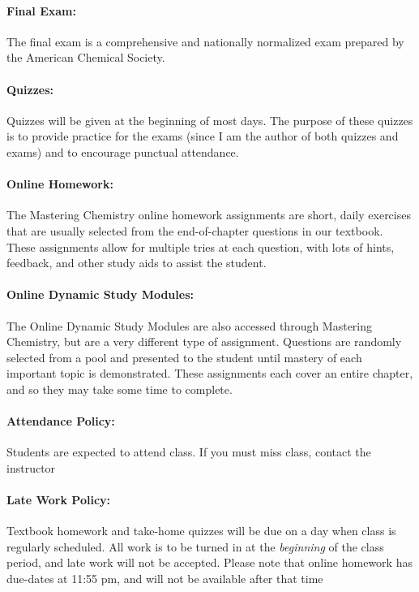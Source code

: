 \documentclass[12pt, letterpaper]{article}
\begin{document}
\paragraph{Final Exam:}
The final exam is a comprehensive and nationally normalized exam prepared by the American Chemical Society.

\paragraph{Quizzes:}
Quizzes will be given at the beginning of most days. The purpose of these quizzes is to provide practice for the exams (since I am the author of both quizzes and exams) and to encourage punctual attendance.

\paragraph{Online Homework:}
The Mastering Chemistry online homework assignments are short, daily exercises that are usually selected from the end-of-chapter questions in our textbook. These assignments allow for multiple tries at each question, with lots of hints, feedback, and other study aids to assist the student.

\paragraph{Online Dynamic Study Modules:}
The Online Dynamic Study Modules are also accessed through Mastering Chemistry, but are a very different type of assignment. Questions are randomly selected from a pool and presented to the student until mastery of each important topic is demonstrated. These assignments each cover an entire chapter, and so they may take some time to complete.

\paragraph{Attendance Policy:}
Students are expected to attend class. If you must miss class, contact the instructor

\paragraph{Late Work Policy:}
Textbook homework and take-home quizzes will be due on a day when class is regularly scheduled. All work is to be turned in at the \emph{beginning} of the class period, and late work will not be accepted. Please note that online homework has due-dates at 11:55 pm, and will not be available after that time
\end{document}
